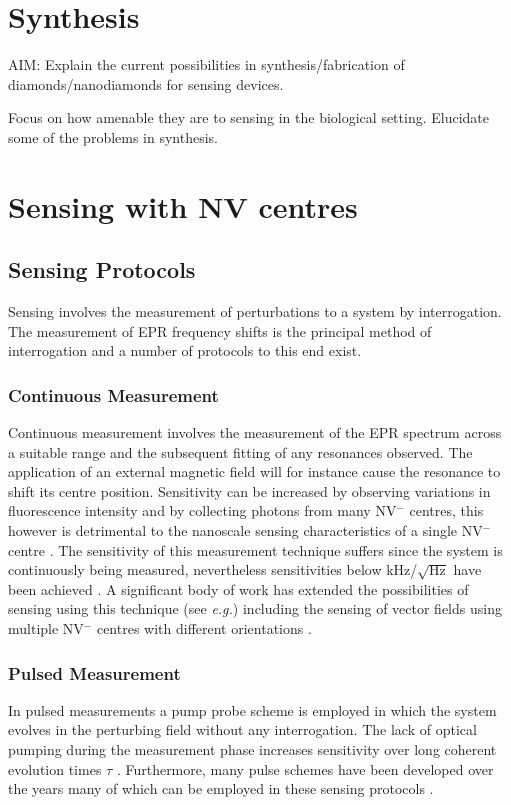 \documentclass[10pt]{article}
\begin{document}
\begin{multicols}{2}
\section{Synthesis}
AIM: Explain the current possibilities in synthesis/fabrication of diamonds/nanodiamonds for sensing devices. 

Focus on how amenable they are to sensing in the biological setting. Elucidate some of the problems in synthesis. 


\section{Sensing with NV centres}

\subsection{Sensing Protocols}
Sensing involves the measurement of perturbations to a system by interrogation. The measurement of EPR frequency shifts is the principal method of interrogation and a number of protocols to this end exist. 

\subsubsection{Continuous Measurement}
Continuous measurement involves the measurement of the EPR spectrum across a suitable range and the subsequent fitting of any resonances observed. The application of an external magnetic field will for instance cause the resonance to shift its centre position. Sensitivity can be increased by observing variations in fluorescence intensity and by collecting photons from many NV$^-$ centres, this however is detrimental to the nanoscale sensing characteristics of a single NV$^-$ centre \cite{schirhagl2014nitrogen}. The sensitivity of this measurement technique suffers since the system is continuously being measured, nevertheless sensitivities below kHz/$\sqrt{\textrm{Hz}}$ have been achieved \cite{acosta2010broadband}. A significant body of work has extended the possibilities of sensing using this technique (see \textit{e.g.}\cite{haberle2013high,schoenfeld2011real}) including the sensing of vector fields using multiple NV$^-$ centres with different orientations \cite{maertz2010vector}.

\subsubsection{Pulsed Measurement}
In pulsed measurements a pump probe scheme is employed in which the system evolves in the perturbing field without any interrogation. The lack of optical pumping during the measurement phase increases sensitivity over long coherent evolution times $\tau$ \cite{maze2008nanoscale}. Furthermore, many pulse schemes have been developed over the years many of which can be employed in these sensing protocols \cite{schirhagl2014nitrogen}.


\end{multicols}
\end{document}
